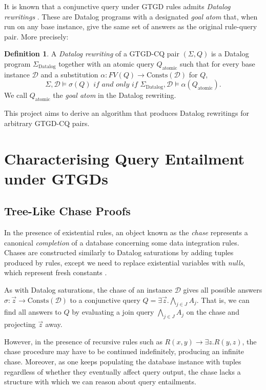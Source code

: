 \documentclass[12pt]{report}
\theoremstyle{plain}
\theoremstyle{definition}
\newtheorem{definition}[theorem]{Definition}
\def\Consts{{\mathrm{Consts}}}
\begin{document}
It is known that a conjunctive query under GTGD rules admits \emph{Datalog rewritings} \cite{barany_benedikt_cate_2013}. These are Datalog programs with a designated \emph{goal atom} that, when run on any base instance, give the same set of answers as the original rule-query pair. More precisely:

\begin{definition}
  A \emph{Datalog rewriting} of a GTGD-CQ pair $(\Sigma, Q)$ is a Datalog program $\Sigma_\mathrm{Datalog}$ together with an atomic query $Q_\mathrm{atomic}$ such that for every base instance $\mathcal{D}$ and a substitution $\alpha: FV(Q) \rightarrow \Consts(\mathcal{D})$ for $Q$, $$\Sigma, \mathcal{D} \models \sigma(Q) \textit{ if and only if } \Sigma_\mathrm{Datalog}, \mathcal{D} \models \alpha(Q_\mathrm{atomic}).$$
  We call $Q_\mathrm{atomic}$ the \emph{goal atom} in the Datalog rewriting.
\end{definition}

This project aims to derive an algorithm that produces Datalog rewritings for arbitrary GTGD-CQ pairs.

\newpage
\chapter{Characterising Query Entailment under GTGDs}

\section{Tree-Like Chase Proofs}

In the presence of existential rules, an object known as the \emph{chase} represents a canonical \emph{completion} of a database concerning some data integration rules. Chases are constructed similarly to Datalog saturations by adding tuples produced by rules, except we need to replace existential variables with \emph{nulls}, which represent fresh constants \cite{fagin_kolaitis_miller_popa_2005}.

As with Datalog saturations, the chase of an instance $\mathcal{D}$ gives all possible answers $\sigma: \vec{z} \rightarrow \Consts(\mathcal{D})$ to a conjunctive query $Q = \exists \vec{z}. \bigwedge_{j \in J} A_j$. That is, we can find all answers to $Q$ by evaluating a join query $\bigwedge_{j \in J} A_j$ on the chase and projecting $\vec{z}$ away.

However, in the presence of recursive rules such as $R(x, y) \rightarrow \exists z. R(y, z)$, the chase procedure may have to be continued indefinitely, producing an infinite chase. Moreover, as one keeps populating the database instance with tuples regardless of whether they eventually affect query output, the chase lacks a structure with which we can reason about query entailments.
\end{document}
